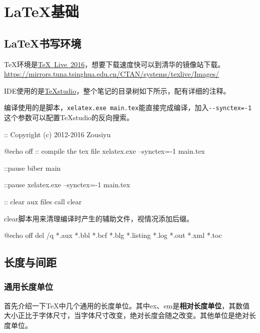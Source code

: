 {\let\clearpage\relax \chapter{\LaTeX 基础}}

\section{\LaTeX 书写环境}

\TeX 环境是\href{http://tug.org/texlive/}{TeX~Live~2016}，想要下载速度快可以到清华的镜像站下载。\url{https://mirrors.tuna.tsinghua.edu.cn/CTAN/systems/texlive/Images/}

IDE使用的是\href{http://texstudio.sourceforge.net/}{TeXstudio}，整个笔记的目录树如下所示，配有详细的注释。


编译使用的是脚本，\lstinline|xelatex.exe main.tex|能直接完成编译，加入\lstinline|--synctex=-1|这个参数可以配置TeXstudio的反向搜索。

\begin{latex}
:: Copyright (c) 2012-2016 Zousiyu

@echo off
:: compile the tex file
xelatex.exe --synctex=-1 main.tex

::pause
biber main

::pause
xelatex.exe --synctex=-1 main.tex

:: clear aux files
call clear
\end{latex}

clear脚本用来清理编译时产生的辅助文件，视情况添加后缀。

\begin{latex}
@echo off
del /q *.aux *.bbl *.bcf *.blg *.listing *.log *.out *.xml *.toc
\end{latex}

\section{长度与间距}
\subsection*{通用长度单位}
首先介绍一下\TeX 中几个通用的长度单位。其中ex、em是\textbf{相对长度单位}，其数值大小正比于字体尺寸，当字体尺寸改变，绝对长度会随之改变。其他单位是绝对长度单位。

